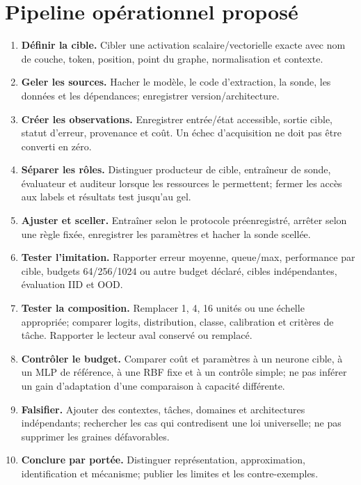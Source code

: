 \documentclass[11pt,a4paper,oneside]{report}
\begin{document}
\section{Pipeline opérationnel proposé}
\begin{enumerate}
\item \textbf{Définir la cible.} Cibler une activation scalaire/vectorielle exacte avec nom de couche, token, position, point du graphe, normalisation et contexte.
\item \textbf{Geler les sources.} Hacher le modèle, le code d'extraction, la sonde, les données et les dépendances; enregistrer version/architecture.
\item \textbf{Créer les observations.} Enregistrer entrée/état accessible, sortie cible, statut d'erreur, provenance et coût. Un échec d'acquisition ne doit pas être converti en zéro.
\item \textbf{Séparer les rôles.} Distinguer producteur de cible, entraîneur de sonde, évaluateur et auditeur lorsque les ressources le permettent; fermer les accès aux labels et résultats test jusqu'au gel.
\item \textbf{Ajuster et sceller.} Entraîner selon le protocole préenregistré, arrêter selon une règle fixée, enregistrer les paramètres et hacher la sonde scellée.
\item \textbf{Tester l'imitation.} Rapporter erreur moyenne, queue/max, performance par cible, budgets 64/256/1024 ou autre budget déclaré, cibles indépendantes, évaluation IID et OOD.
\item \textbf{Tester la composition.} Remplacer 1, 4, 16 unités ou une échelle appropriée; comparer logits, distribution, classe, calibration et critères de tâche. Rapporter le lecteur aval conservé ou remplacé.
\item \textbf{Contrôler le budget.} Comparer coût et paramètres à un neurone cible, à un MLP de référence, à une RBF fixe et à un contrôle simple; ne pas inférer un gain d'adaptation d'une comparaison à capacité différente.
\item \textbf{Falsifier.} Ajouter des contextes, tâches, domaines et architectures indépendants; rechercher les cas qui contredisent une loi universelle; ne pas supprimer les graines défavorables.
\item \textbf{Conclure par portée.} Distinguer représentation, approximation, identification et mécanisme; publier les limites et les contre-exemples.
\end{enumerate}
\end{document}
